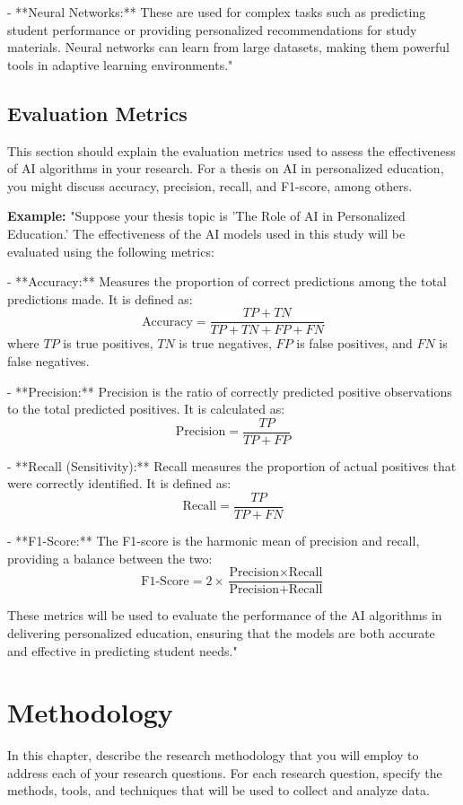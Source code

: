 \documentclass[english,f,master,binding,twoside,palatino, scrreprt]{WeSTthesis}
\begin{document}
- **Neural Networks:** These are used for complex tasks such as predicting student performance or providing personalized recommendations for study materials. Neural networks can learn from large datasets, making them powerful tools in adaptive learning environments."

\section{Evaluation Metrics}
This section should explain the evaluation metrics used to assess the effectiveness of AI algorithms in your research. For a thesis on AI in personalized education, you might discuss accuracy, precision, recall, and F1-score, among others.

\textbf{Example:}  
"Suppose your thesis topic is 'The Role of AI in Personalized Education.' The effectiveness of the AI models used in this study will be evaluated using the following metrics:

- **Accuracy:** Measures the proportion of correct predictions among the total predictions made. It is defined as:
\[
\text{Accuracy} = \frac{TP + TN}{TP + TN + FP + FN}
\]
where \(TP\) is true positives, \(TN\) is true negatives, \(FP\) is false positives, and \(FN\) is false negatives.

- **Precision:** Precision is the ratio of correctly predicted positive observations to the total predicted positives. It is calculated as:
\[
\text{Precision} = \frac{TP}{TP + FP}
\]

- **Recall (Sensitivity):** Recall measures the proportion of actual positives that were correctly identified. It is defined as:
\[
\text{Recall} = \frac{TP}{TP + FN}
\]

- **F1-Score:** The F1-score is the harmonic mean of precision and recall, providing a balance between the two:
\[
\text{F1-Score} = 2 \times \frac{\text{Precision} \times \text{Recall}}{\text{Precision} + \text{Recall}}
\]

These metrics will be used to evaluate the performance of the AI algorithms in delivering personalized education, ensuring that the models are both accurate and effective in predicting student needs."

\chapter{Methodology}
In this chapter, describe the research methodology that you will employ to address each of your research questions. For each research question, specify the methods, tools, and techniques that will be used to collect and analyze data.
\end{document}
